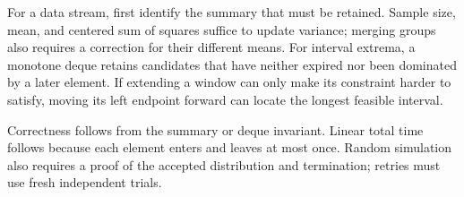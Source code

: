 For a data stream, first identify the summary that must be retained. Sample size, mean, and centered sum of squares suffice to update variance; merging groups also requires a correction for their different means. For interval extrema, a monotone deque retains candidates that have neither expired nor been dominated by a later element. If extending a window can only make its constraint harder to satisfy, moving its left endpoint forward can locate the longest feasible interval.

Correctness follows from the summary or deque invariant. Linear total time follows because each element enters and leaves at most once. Random simulation also requires a proof of the accepted distribution and termination; retries must use fresh independent trials.
\par\smallskip
